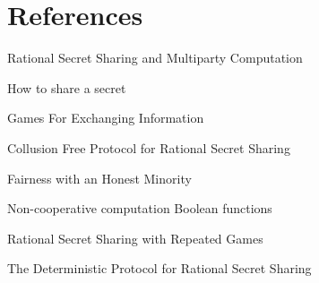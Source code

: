 \documentclass{dalcsthesis}
\begin{document}
\chapter{References}
\begin{thebibliography}{9}

\bibitem{} Rational Secret Sharing and Multiparty Computation

 How to share a secret

\bibitem{} Games For Exchanging Information

\bibitem{} Collusion Free Protocol for Rational Secret Sharing

\bibitem{} Fairness with an Honest Minority

\bibitem{} Non-cooperative computation Boolean functions

\bibitem{} Rational Secret Sharing with Repeated Games

\bibitem{} The Deterministic Protocol for Rational Secret Sharing

\end{thebibliography}
\end{document}
